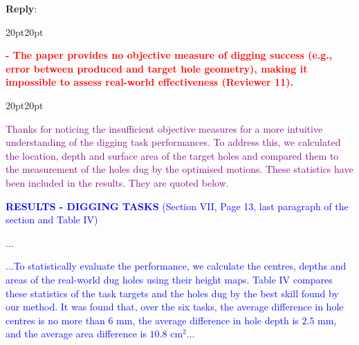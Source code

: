 \documentclass[11pt]{article}
\newenvironment{reply}
   {\medskip \noindent \begin{sf}\textbf{Reply}: \  }
   {\medskip \end{sf}}
\newcommand{\rv}[1]{\textcolor{red}{#1}}
\newcommand{\rp}[1]{\textcolor{purple}{#1}}
\newcommand{\xt}[1]{\textcolor{blue}{#1}}
\begin{document}
\begin{reply}
\begin{adjustwidth}{20pt}{20pt}
\end{adjustwidth}

\clearpage
\vspace{0.3cm}\noindent\rv{\textbf{- The paper provides no objective measure of digging success (e.g., error between produced and target hole geometry), making it impossible to assess real-world effectiveness (Reviewer 11).}}
\begin{adjustwidth}{20pt}{20pt}

\rp{Thanks for noticing the insufficient objective measures for a more intuitive understanding of the digging task performances. To address this, we calculated the location, depth and surface area of the target holes and compared them to the measurement of the holes dug by the optimised motions. These statistics have been included in the results. They are quoted below.}

\vspace{0.3cm}\noindent\xt{\textbf{RESULTS - DIGGING TASKS} (Section VII, Page 13, last paragraph of the section and Table IV)}

\xt{...}

\xt{...To statistically evaluate the performance, we calculate the centres, depths and areas of the real-world dug holes using their height maps. Table IV compares these statistics of the task targets and the holes dug by the best skill found by our method. It was found that, over the six tasks, the average difference in hole centres is no more than $6$ mm, the average difference in hole depth is $2.5$ mm, and the average area difference is $10.8$ cm$^2$...}


\end{adjustwidth}
\end{reply}
\end{document}

